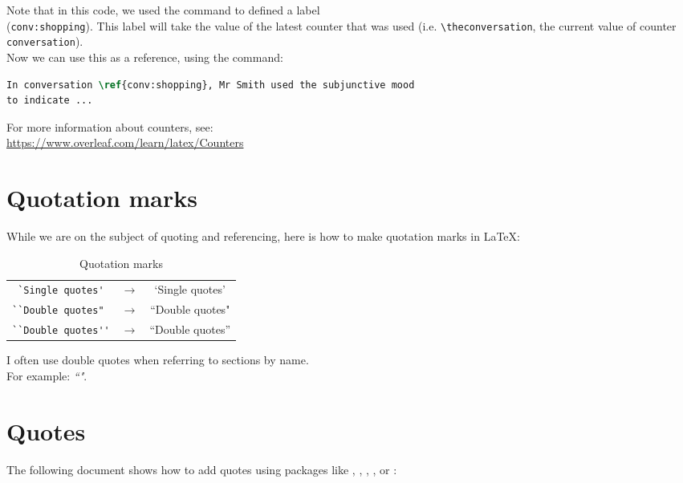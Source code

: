 \bigskip

Note that in this code, we used the  command to defined a label \\
(\texttt{conv:shopping}). This label will take the value of the latest counter that was used (i.e. \texttt{\textbackslash theconversation}, the current value of counter \texttt{conversation}). \\

Now we can use this as a reference, using the  command:
\begin{lstlisting}[language=tex]
In conversation \ref{conv:shopping}, Mr Smith used the subjunctive mood 
to indicate ...
\end{lstlisting}

\bigskip

For more information about counters, see: \\
\url{https://www.overleaf.com/learn/latex/Counters} 

\bigskip



\section{Quotation marks}

While we are on the subject of quoting and referencing, here is how to make quotation marks in \LaTeX:

\begin{table}[h]
	\caption{Quotation marks}
	\centering
	\medskip

	\begin{tabular}{ c c c }
		\lstinline| `Single quotes' | & $\rightarrow$ & `Single quotes' \\
		\lstinline|``Double quotes" | & $\rightarrow$ & ``Double quotes" \\
		\lstinline|``Double quotes''| & $\rightarrow$ & ``Double quotes'' \\
	\end{tabular}
\end{table}


I often use double quotes when referring to sections by name.\\ 
For example: \emph{``"}.

\section{Quotes}

The following document shows how to add quotes using packages like 
,
,
,
, or
: \citep{typesetting-quotations}\\

